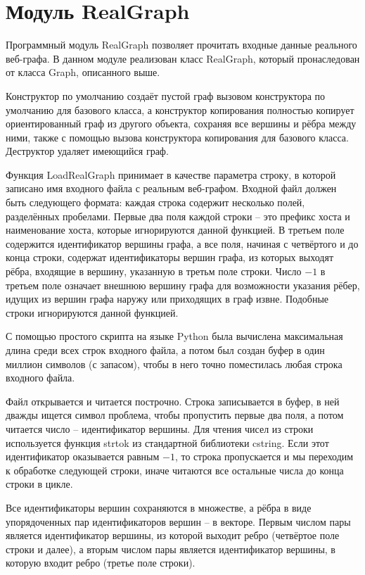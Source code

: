 \documentclass[14pt]{extreport}
\begin{document}
\section{Модуль RealGraph}

Программный модуль RealGraph позволяет прочитать входные данные реального веб-графа. В данном модуле реализован класс RealGraph, который пронаследован от класса Graph, описанного выше.

Конструктор по умолчанию создаёт пустой граф вызовом конструктора по умолчанию для базового класса, а конструктор копирования полностью копирует ориентированный граф из другого объекта, сохраняя все вершины и рёбра между ними, также с помощью вызова конструктора копирования для базового класса. Деструктор удаляет имеющийся граф.

Функция LoadRealGraph принимает в качестве параметра строку, в которой записано имя входного файла с реальным веб-графом. Входной файл должен быть следующего формата: каждая строка содержит несколько полей, разделённых пробелами. Первые два поля каждой строки -- это префикс хоста и наименование хоста, которые игнорируются данной функцией. В третьем поле содержится идентификатор вершины графа, а все поля, начиная с четвёртого и до конца строки, содержат идентификаторы вершин графа, из которых выходят рёбра, входящие в вершину, указанную в третьм поле строки. Число $-1$ в третьем поле означает внешнюю вершину графа для возможности указания рёбер, идущих из вершин графа наружу или приходящих в граф извне. Подобные строки игнорируются данной функцией.

С помощью простого скрипта на языке Python была вычислена максимальная длина среди всех строк входного файла, а потом был создан буфер в один миллион символов (с запасом), чтобы в него точно поместилась любая строка входного файла.

Файл открывается и читается построчно. Строка записывается в буфер, в ней дважды ищется символ проблема, чтобы пропустить первые два поля, а потом читается число -- идентификатор вершины. Для чтения чисел из строки используется функция strtok из стандартной библиотеки cstring. Если этот идентификатор оказывается равным $-1$, то строка пропускается и мы переходим к обработке следующей строки, иначе читаются все остальные числа до конца строки в цикле.

Все идентификаторы вершин сохраняются в множестве, а рёбра в виде упорядоченных пар идентификаторов вершин -- в векторе. Первым числом пары является идентификатор вершины, из которой выходит ребро (четвёртое поле строки и далее), а вторым числом пары является идентификатор вершины, в которую входит ребро (третье поле строки).
\end{document}
